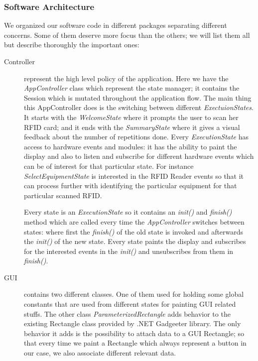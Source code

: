 \documentclass{tk3-team}
\begin{document}
\subsubsection{Software Architecture}

We organized our software code in different packages separating different concerns. Some of them deserve more focus than the others; we will list them all but describe thoroughly the important ones:

\begin{description}
\item[Controller] represent the high level policy of the application. Here we have the \textit{AppController} class which represent the state manager; it contains the Session which is mutated throughout the application flow. The main thing this AppController does is the switching between different \textit{ExectuionStates}. It starts with the \textit{WelcomeState} where it prompts the user to scan her RFID card; and it ends with the \textit{SummaryState} where it gives a visual feedback about the number of repetitions done. Every \textit{ExecutionState} has access to hardware events and modules: it has the ability to paint the display and also to listen and subscribe for different hardware events which can be of interest for that particular state. For instance \textit{SelectEquipmentState} is interested in the RFID Reader events so that it can process further with identifying the particular equipment for that particular scanned RFID. 

Every state is an \textit{ExecutionState} so it contains an \textit{init()} and \textit{finish()} method which are called every time the \textit{AppController} switches between states: where first the \textit{finish()} of the old state is invoked and afterwards the \textit{init()} of the new state. Every state paints the display and subscribes for the interested events in the \textit{init()} and unsubscribes from them in \textit{finish()}.

\item[GUI] contains two different classes. One of them used for holding some global constants that are used from different states for painting GUI related stuffs. The other class \textit{ParameterizedRectangle} adds behavior to the existing Rectangle class provided by .NET Gadgeeter library. The only behavior it adds is the possibility to attach data to a GUI Rectangle; so that every time we paint a Rectangle which always represent a button in our case, we also associate different relevant data.  


\end{description}
\end{document}
